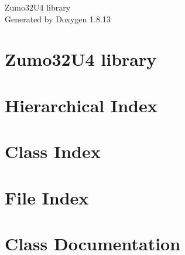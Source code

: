 \documentclass[twoside]{book}
\newcommand{\+}{\discretionary{\mbox{\scriptsize$\hookleftarrow$}}{}{}}
\newcommand{\clearemptydoublepage}{%
  \newpage{\pagestyle{empty}\cleardoublepage}%
}
\begin{document}
\hypersetup{pageanchor=false,
             bookmarksnumbered=true,
             pdfencoding=unicode
            }
\begin{titlepage}
\vspace*{7cm}
\begin{center}%
{\Large Zumo32\+U4 library }\\
\vspace*{1cm}
{\large Generated by Doxygen 1.8.13}\\
\end{center}
\end{titlepage}
\clearemptydoublepage
{}
\tableofcontents
\clearemptydoublepage
{}
\hypersetup{pageanchor=true}

\chapter{Zumo32\+U4 library}
\label{index}\hypertarget{index}{}
\chapter{Hierarchical Index}

\chapter{Class Index}

\chapter{File Index}

\chapter{Class Documentation}



























\end{document}

